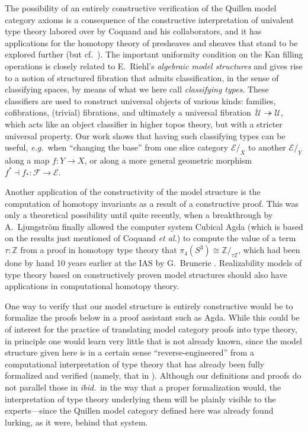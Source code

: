 \documentclass[11pt,reqno]{amsart}
\newcommand{\eg}{\emph{e.g.}}
\newcommand{\ibid}{\emph{ibid.}}
\newcommand{\Z}{\ensuremath{\mathbb{Z}}}
\newcommand{\FF}{\ensuremath{\mathcal{F}}}
\newcommand{\EE}{\ensuremath{\mathcal{E}}}
\newcommand{\slice}[1]{\ensuremath{/_{\!{#1}}}}
\newcommand{\fib}{\ensuremath{\twoheadrightarrow}}
\renewcommand{\to}{\ensuremath{\rightarrow}}
\newcommand{\U}{\ensuremath{\mathcal{U}}}
\newcommand{\UU}{\ensuremath{\,\dot{\mathcal{U}}}}
\theoremstyle{remark}
\theoremstyle{definition}
\begin{document}
The possibility of an entirely constructive verification of the Quillen model category axioms is a consequence of the constructive interpretation of univalent type theory labored over by Coquand and his collaborators, and it has applications for the homotopy theory of presheaves and sheaves that stand to be explored further (but cf.~\cite{Coq:stack2017}).   The important uniformity condition on the Kan filling operations is closely related to E.~Riehl's \emph{algebraic model structures} \cite{riehl-algebraic-model} and gives rise to a notion of structured fibration that admits classification, in the sense of classifying spaces, by means of what we here call \emph{classifying types}.   These classifiers are used to construct universal objects of various kinds: families, cofibrations, (trivial) fibrations, and ultimately a universal fibration $\UU\fib\U$, which acts like an object classifier in higher topos theory, but with a stricter universal property.  Our work shows that having such classifying types can be useful, \eg\ when ``changing the base'' from one slice category $\EE\slice{X}$ to another $\EE\slice{Y}$ along a map $f : Y\to X$, or along a more general geometric morphism $f^*\dashv f_* : \FF \to \EE$.

Another application of the constructivity of the model structure is the computation of homotopy invariants as a result of a constructive proof.  This was only a theoretical possibility until quite recently, when a breakthrough by  A.~Ljungstr\"om \cite{AxelLj:2022} finally allowed the computer system Cubical Agda \cite{VezzosiMortbergAbel19} (which is based on the results just mentioned of Coquand \emph{et al.}) to compute the value of a term $\tau:\Z$ from a proof in homotopy type theory that $\pi_4(S^3)\cong \Z/_{\!\tau\Z}$, which had been done by hand 10 years earlier at the IAS by G.\ Brunerie \cite{GB:IAS2013}.  Realizability models of type theory based on constructively proven model structures should also have applications in computational homotopy theory.

One way to verify that our model structure is entirely constructive would be to formalize the proofs below in a proof assistant such as Agda.  While this could be of interest for the practice of translating model category proofs into type theory, in principle one would learn very little that is not already known, since the model structure given here is in a certain sense ``reverse-engineered'' from a computational interpretation of type theory that has already been fully formalized and verified (namely, that in \cite{ABCHFL}).  Although our definitions and proofs do not parallel those in \ibid\ in the way that a proper formalization would, the interpretation of type theory underlying them will be plainly visible to the experts---since the Quillen model category defined here was already found lurking, as it were, behind that system.
\end{document}
